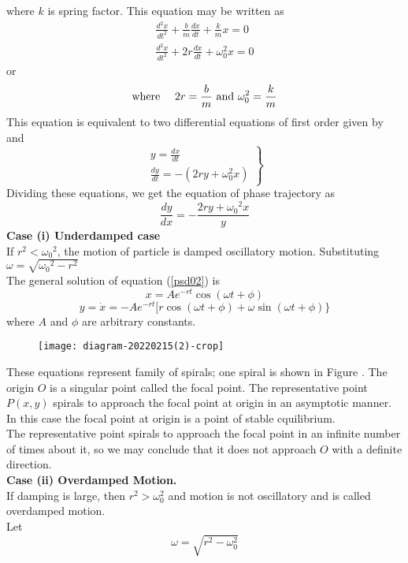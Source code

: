 where $k$ is spring factor. This equation may be written as
$$
\begin{array}{l}
\frac{d^{2} x}{d t^{2}}+\frac{b}{m} \frac{d x}{d t}+\frac{k}{m} x=0 \\
\frac{d^{2} x}{d t^{2}}+2 r \frac{d x}{d t}+\omega_{0}^{2} x=0
\end{array}
$$
or\\
\begin{equation}
\text{where }\quad 2 r=\frac{b}{m}\text{ and }\omega_{0}^{2}=\frac{k}{m} \label{psd02}\\
\end{equation}
This equation is equivalent to two differential equations of first order given by
and
$$
\left.\begin{array}{l}
y=\frac{d x}{d t} \\
\frac{d y}{d t}=-\left(2 r y+\omega_{0}^{2} x\right)
\end{array}\right\}
$$
Dividing these equations, we get the equation of phase trajectory as
$$
\frac{d y}{d x}=-\frac{2 r y+\omega_{0}{ }^{2} x}{y}
$$
\textbf{Case (i) Underdamped case}\\
If $r^{2}<\omega_{0}{ }^{2}$, the motion of particle is damped oscillatory motion. Substituting $\omega=\sqrt{\omega_{0}{ }^{2}-r^{2}}$\\
The general solution of equation (\ref{psd02}) is 
$$x=A e^{-r t} \cos (\omega t+\phi)$$
$$y=\dot{x}=-A e^{-r t}[r \cos (\omega t+\phi)+\omega \sin (\omega t+\phi)\}$$where $A$ and $\phi$ are arbitrary constants.
\begin{figure}[H]
	\centering
	\texttt{[image: diagram-20220215(2)-crop]}
	\caption{}
	\label{}
\end{figure}
These equations represent family of spirals; one spiral is shown in Figure . The origin $O$ is a singular point called the focal point. The representative point $P(x, y)$ spirals to approach the focal point at origin in an asymptotic manner. In this case the focal point at origin is a point of stable cquilibrium.\\
The representative point spirals to approach the focal point in an infinite number of times about it, so we may conclude that it does not approach $O$ with a definite direction.\\
\textbf{Case (ii) Overdamped Motion. }\\
If damping is large, then $r^{2}>\omega_{0}^{2}$ and motion is not oscillatory and is called overdamped motion.\\
Let
$$
\omega=\sqrt{r^{2}-\omega_{0}^{2}}
$$
